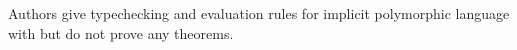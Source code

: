 \documentclass[12pt]{article}	%
\begin{document}
	Authors give typechecking and evaluation rules for implicit polymorphic language with \Dynamic but do not prove any theorems.
	
	
%	
\end{document}
